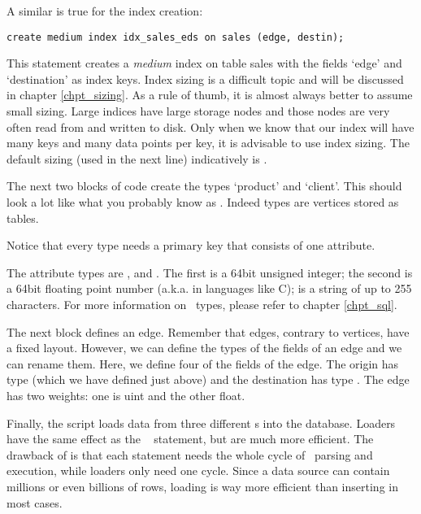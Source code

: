 A similar is true for the index creation:

\begin{sqlcode}
\begin{lstlisting}
create medium index idx_sales_eds on sales (edge, destin);
\end{lstlisting}
\end{sqlcode}

This statement creates a \emph{medium} index on table sales
with the fields `edge' and `destination' as index keys.
Index sizing is a difficult topic and will be discussed
in chapter \ref{chpt_sizing}.
As a rule of thumb, it is almost always better to assume
small sizing. Large indices have large storage nodes
and those nodes are very often read from and written
to disk. Only when we know that our index will have
many keys and many data points per key, it is advisable
to use index sizing. The default sizing (used in the next
line) indicatively is .

The next two blocks of code create the types
`product' and `client'. This should look a lot like
what you probably know as . Indeed types
are vertices stored as  tables.

Notice that every type needs a primary key that consists
of one attribute.

The attribute types are ,  and .
The first is a 64bit unsigned integer;
the second is a 64bit floating point number
(a.k.a.  in languages like C);
 is a string of up to 255  characters.
For more information on \sql\ types, please refer to chapter
\ref{chpt_sql}.

The next block defines an edge. Remember
that edges, contrary to vertices, have a fixed layout.
However, we can define the types of the fields of an edge
and we can rename them. 
Here, we define four of the fields of the edge.
The origin has type  (which we have defined just above)
and the destination has type .
The edge has two weights: one is uint and the other float.

Finally, the script loads data from three different s
into the database. Loaders have the same effect as the \sql\
 statement, but are much more efficient.
The drawback of \term{insert} is that each statement
needs the whole cycle of \sql\ parsing and execution,
while loaders only need one cycle. Since a data source
can contain millions or even billions of rows,
loading is way more efficient than inserting in most cases.

